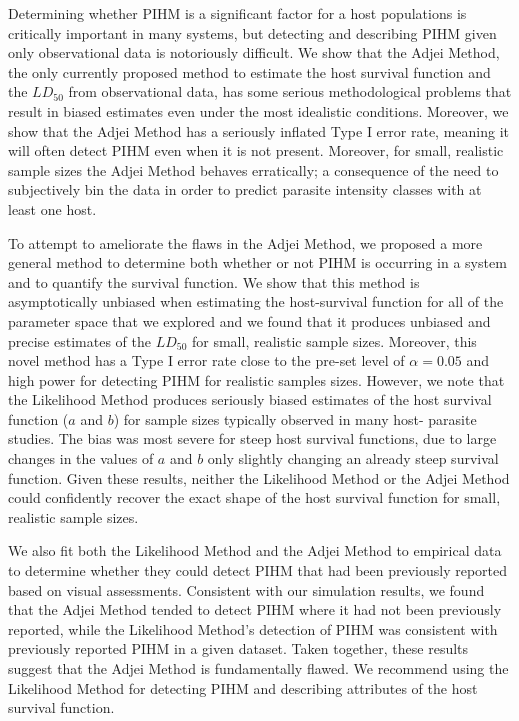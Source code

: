 \documentclass[12pt, a4paper]{article}
\begin{document}
Determining whether PIHM is a significant factor for a host populations is
critically important in many systems, but detecting and describing PIHM given
only observational data is notoriously difficult.  We show that the Adjei
Method, the only currently proposed method to estimate the host survival
function and the $LD_{50}$ from observational data, has some serious
methodological problems that result in biased estimates even under the most idealistic conditions.
Moreover, we show that the Adjei Method has a seriously inflated Type I error
rate, meaning it will often detect PIHM even when it is not present. Moreover,
for small, realistic sample sizes the Adjei Method behaves erratically; a
consequence of the need to subjectively bin the data in order to predict
parasite intensity classes with at least one host.

To attempt to ameliorate the flaws in the Adjei Method, we proposed a more
general method to determine both whether or not PIHM is occurring in a system
and to quantify the survival function.  We show that this method is
asymptotically unbiased when estimating the host-survival function for all of
the parameter space that we explored and we found that it produces unbiased and
precise estimates of the $LD_{50}$ for small, realistic sample sizes. Moreover,
this novel method has a Type I error rate close to the pre-set level of $\alpha = 0.05$ and high power for detecting PIHM for realistic samples sizes.
  However, we note that
the Likelihood Method produces seriously biased estimates of the host survival
function ($a$ and $b$) for sample sizes typically observed in many host-
parasite studies.  The bias was most severe for steep host survival functions,
due to large changes in the values of $a$ and $b$ only slightly changing an
already steep survival function.  Given these results, neither the
Likelihood Method or the Adjei Method could confidently recover the exact shape of the host survival function for small, realistic sample sizes.

We also fit both the Likelihood Method and the Adjei Method to empirical data to
determine whether they could detect PIHM that had been previously reported
based on visual assessments.  Consistent with our simulation results, we found
that the Adjei Method tended to detect PIHM where it had not been previously
reported, while the Likelihood Method's detection of PIHM was consistent with
previously reported PIHM in a given dataset.  Taken together, these results suggest that the Adjei Method is fundamentally
flawed.  We recommend using the Likelihood Method for detecting PIHM and describing attributes of the host survival function.
\end{document}
